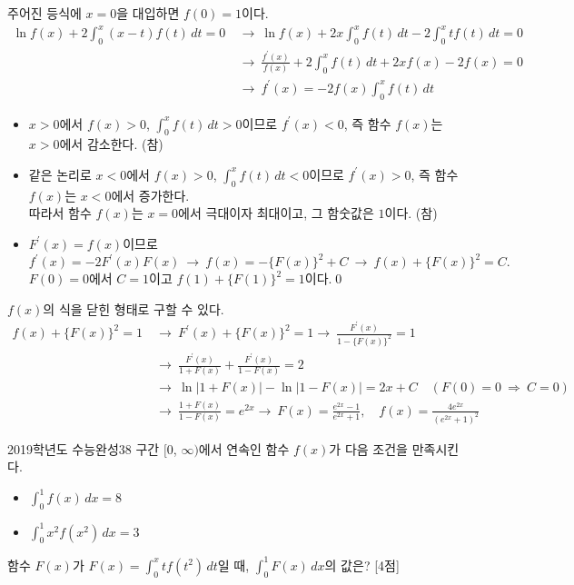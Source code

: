 \documentclass{article}
\begin{document}
\begin{sol}
	주어진 등식에 $x=0$을 대입하면 $f(0)=1$이다.
	\begin{align*}
		\ln f(x)+2\int_0^x(x-t)f(t)\,dt=0~&\longrightarrow~\ln f(x)+2x\int_0^xf(t)\,dt-2\int_0^xtf(t)\,dt=0\\[3pt]
		&\longrightarrow~\frac{f^{\prime}(x)}{f(x)}+2\int_0^xf(t)\,dt+2xf(x)-2f(x)=0\\[3pt]
		&\longrightarrow~f^{\prime}(x)=-2f(x)\int_0^xf(t)\,dt
	\end{align*}
	\begin{itemize}
		\item[ㄱ.] $x>0$에서 $f(x)>0$, $\displaystyle\int_0^xf(t)\,dt>0$이므로 $f^{\prime}(x)<0$, 즉 함수 $f(x)$는 $x>0$에서 감소한다. (참)
		\item[ㄴ.] 같은 논리로 $x<0$에서 $f(x)>0$, $\displaystyle\int_0^xf(t)\,dt<0$이므로 $f^{\prime}(x)>0$, 즉 함수 $f(x)$는 $x<0$에서 증가한다.\\[3pt] 따라서 함수 $f(x)$는 $x=0$에서 극대이자 최대이고, 그 함숫값은 $1$이다. (참)
		\item[ㄷ.] $F^{\prime}(x)=f(x)$이므로
			\[
				f^{\prime}(x)=-2F^{\prime}(x)F(x)~\longrightarrow~f(x)=-\{F(x)\}^2+C~\longrightarrow~f(x)+\{F(x)\}^2=C.
			\]
			$F(0)=0$에서 $C=1$이고 $f(1)+\{F(1)\}^2=1$이다.\qed
	\end{itemize}
\end{sol}

\begin{remark}
	$f(x)$의 식을 닫힌 형태로 구할 수 있다.
	\[
		\begin{aligned}
			f(x)+\{F(x)\}^2=1~&\longrightarrow~F^{\prime}(x)+\{F(x)\}^2=1\longrightarrow~\frac{F^{\prime}(x)}{1-\{F(x)\}^2}=1\\[3pt]
			&\longrightarrow~\frac{F^{\prime}(x)}{1+F(x)}+\frac{F^{\prime}(x)}{1-F(x)}=2\\[3pt]
			&\longrightarrow~\ln\vert 1+F(x)\vert-\ln\vert1-F(x)\vert=2x+C\quad(F(0)=0~\Longrightarrow~C=0)\\[3pt]
			&\longrightarrow~\frac{1+F(x)}{1-F(x)}=e^{2x}\longrightarrow~F(x)=\frac{e^{2x}-1}{e^{2x}+1},\quad f(x)=\frac{4e^{2x}}{(e^{2x}+1)^2}
		\end{aligned}
	\]
\end{remark}

\newpage
\begin{prob}{2019학년도 수능완성}{38}
	구간 $[0$, $\infty)$에서 연속인 함수 $f(x)$가 다음 조건을 만족시킨다.
	\begin{hint}
		\begin{itemize}
			\item[(가)] $\displaystyle\int_0^1f(x)\,dx=8$
			\item[(나)] $\displaystyle\int_0^1x^2f(x^2)\,dx=3$
		\end{itemize}
	\end{hint}
	함수 $F(x)$가 $F(x)=\displaystyle\int_0^xtf(t^2)\,dt$일 때, $\displaystyle\int_0^1F(x)\,dx$의 값은? [4점]
\end{prob}
\end{document}
